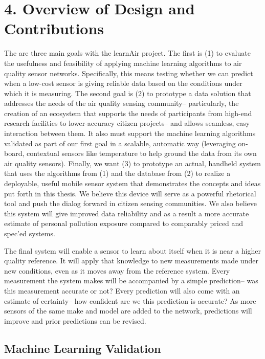 \chapter{4. Overview of Design and Contributions}

The are three main goals with the learnAir project.  The first is (1) to evaluate the usefulness and feasibility of applying machine learning algorithms to air quality sensor networks.  Specifically, this means testing whether we can predict when a low-cost sensor is giving reliable data based on the conditions under which it is measuring. The second goal is (2) to prototype a data solution that addresses the needs of the air quality sensing community-- particularly, the creation of an ecosystem that supports the needs of participants from high-end research facilities to lower-accuracy citizen projects-- and allows seamless, easy interaction between them.  It also must support the machine learning algorithms validated as part of our first goal in a scalable, automatic way (leveraging on-board, contextual sensors like temperature to help ground the data from its own air quality sensors).  Finally, we want (3) to prototype an actual, handheld system that uses the algorithms from (1) and the database from (2) to realize a deployable, useful mobile sensor system that demonstrates the concepts and ideas put forth in this thesis.  We believe this device will serve as a powerful rhetorical tool and push the dialog forward in citizen sensing communities.  We also believe this system will give improved data reliability and as a result a more accurate estimate of personal pollution exposure compared to comparably priced and spec'ed systems.      

The final system will enable a sensor to learn about itself when it is near a higher quality reference.  It will apply that knowledge to new measurements made under new conditions, even as it moves away from the reference system.  Every measurement the system makes will be accompanied by a simple prediction-- was this measurement accurate or not?  Every prediction will also come with an estimate of certainty-- how confident are we this prediction is accurate?  As more sensors of the same make and model are added to the network, predictions will improve and prior predictions can be revised.

\section{Machine Learning Validation}

